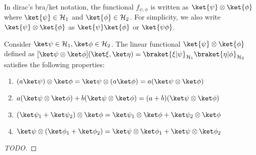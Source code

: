 \begin{note}
    In dirac's bra/ket notation, the functional $f_{\psi,\phi}$ is written as $\ket{\psi} \otimes \ket{\phi}$ where $\ket{\psi} \in \mathcal{H}_1$ and $\ket{\phi} \in \mathcal{H}_2$.
    For simplicity, we also write $\ket{\psi} \otimes \ket{\phi}$ as $\ket{\psi}\ket{\phi}$ or $\ket{\psi\phi}$.
\end{note}


\begin{prop}
    Consider $\ket\psi \in \mathcal{H}_1, \ket\phi \in \mathcal{H}_2$.
    The linear functional $\ket{\psi} \otimes \ket{\phi}$ defined as $[\ket\psi \otimes \ket\phi](\ket\xi,\ket\eta) = \braket{\xi|\psi}_{\mathcal{H}_1}\braket{\eta|\phi}_{\mathcal{H}_2}$  satisfies the following properties:
    \begin{enumerate}
        \item $(a \ket\psi) \otimes \ket\phi = \ket\psi \otimes (a \ket\phi) = a (\ket\psi \otimes \ket\phi)$
        \item $a (\ket\psi \otimes \ket\phi) + b (\ket\psi \otimes \ket\phi) = (a + b) (\ket\psi \otimes \ket\phi)$
        \item $(\ket\psi_1 + \ket\psi_2) \otimes \ket\phi = \ket\psi_1 \otimes \ket\phi + \ket\psi_2 \otimes \ket\phi$
        \item $\ket\psi \otimes (\ket\phi_1 + \ket\phi_2) = \ket\psi \otimes \ket\phi_1 + \ket\psi \otimes \ket\phi_2$
    \end{enumerate}
\end{prop}
\begin{proof}
    [TODO]
\end{proof}


